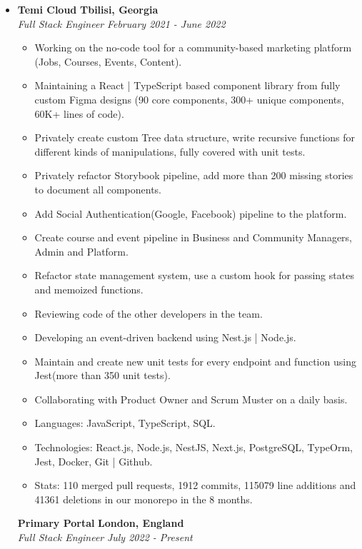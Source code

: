 \documentclass[10pt,letterpaper]{article}
\begin{document}
  \begin{itemize}
    \item[]
    {\textbf{Temi Cloud} \hfill
      \textbf{Tbilisi, Georgia}}
    \\
    {\emph{Full Stack Engineer} \hfill \emph{February 2021 - June 2022}}

    \begin{itemize}[label=\textbullet]
    \itemsep0.5em
    \item Working on the no-code tool for a community-based marketing platform (Jobs, Courses, Events, Content).
    \item Maintaining a React | TypeScript based component library from fully custom Figma designs (90 core components, 300+ unique components, 60K+ lines of code).
    \item Privately create custom Tree data structure, write recursive functions for different kinds of manipulations, fully covered with unit tests.
    \item Privately refactor Storybook pipeline, add more than 200 missing stories to document all components.
    \item Add Social Authentication(Google, Facebook) pipeline to the platform.
    \item Create course and event pipeline in Business and Community Managers, Admin and Platform.
    \item Refactor state management system, use a custom hook for passing states and memoized functions.
    \item Reviewing code of the other developers in the team.
    \item Developing an event-driven backend using Nest.js | Node.js.
    \item Maintain and create new unit tests for every endpoint and function using Jest(more than 350 unit tests).
    \item Collaborating with Product Owner and Scrum Muster on a daily basis.
    \item Languages: JavaScript, TypeScript, SQL.
    \item Technologies: React.js, Node.js, NestJS, Next.js, PostgreSQL, TypeOrm, Jest, Docker, Git | Github.
    \item Stats: 110 merged pull requests, 1912 commits, 115079 line additions and 41361 deletions in our monorepo in the 8 months.
    \end{itemize}

    {\textbf{Primary Portal} \hfill
    \textbf{London, England}}
  \\
  {\emph{Full Stack Engineer} \hfill \emph{July 2022 - Present}}


\end{itemize}
\end{document}
